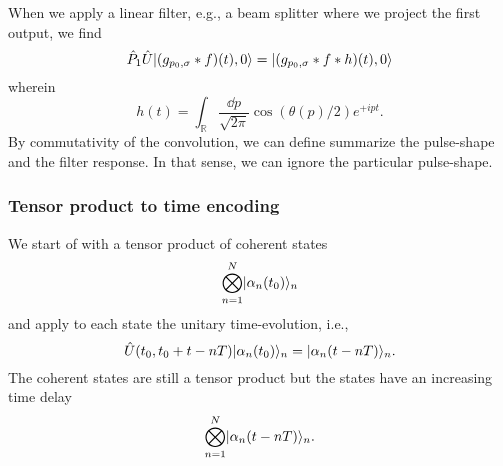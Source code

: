 When we apply a linear filter, e.g., a beam splitter where we project the first output, we find
\begin{equation}
	\hat{P}_1\hat{U}\lvert(g_{p_0,\sigma}*f)(t),0\rangle
	=
	\lvert(g_{p_0,\sigma}*f*h)(t),0\rangle
\end{equation}
wherein
\begin{equation}
	h(t)
	=
	\int_{\mathbb{R}}
	\frac{\dd{p}}{\sqrt{2\pi}}
	\cos(\theta(p)/2)
	e^{+ipt}
	.
\end{equation}
By commutativity of the convolution, we can define summarize the pulse-shape and the filter response.
In that sense, we can ignore the particular pulse-shape.

\subsubsection{Tensor product to time encoding}

We start of with a tensor product of coherent states
\begin{equation}
	\bigotimes_{n=1}^N
	\lvert\alpha_n(t_0)\rangle_n
\end{equation}
and apply to each state the unitary time-evolution, i.e.,
\begin{equation}
	\hat{U}(t_0,t_0+t-nT)
	\lvert\alpha_n(t_0)\rangle_n
	=
	\lvert\alpha_n(t-nT)\rangle_n
	.
\end{equation}
The coherent states are still a tensor product but the states have an increasing time delay
\begin{equation}
	\bigotimes_{n=1}^N
	\lvert\alpha_n(t-nT)\rangle_n
	.
\end{equation}

